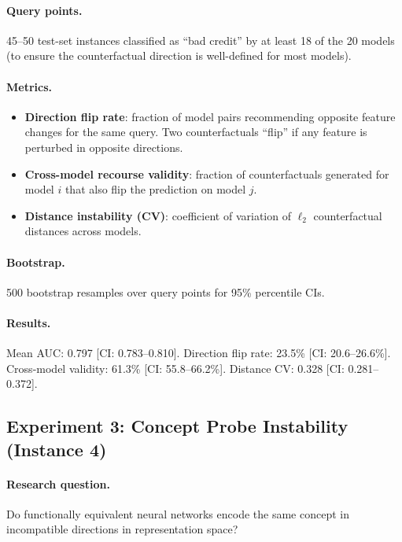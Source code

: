 \documentclass[11pt,a4paper]{article}
\begin{document}
\paragraph{Query points.}
45--50 test-set instances classified as ``bad credit'' by at least 18 of the
20 models (to ensure the counterfactual direction is well-defined for most
models).

\paragraph{Metrics.}
\begin{itemize}[nosep]
  \item \textbf{Direction flip rate}: fraction of model pairs recommending
    opposite feature changes for the same query.  Two counterfactuals ``flip''
    if any feature is perturbed in opposite directions.
  \item \textbf{Cross-model recourse validity}: fraction of counterfactuals
    generated for model $i$ that also flip the prediction on model $j$.
  \item \textbf{Distance instability (CV)}: coefficient of variation of
    $\ell_2$ counterfactual distances across models.
\end{itemize}

\paragraph{Bootstrap.}
500 bootstrap resamples over query points for 95\% percentile CIs.

\paragraph{Results.}
Mean AUC: 0.797 [CI: 0.783--0.810].  Direction flip rate: 23.5\%
[CI: 20.6--26.6\%].  Cross-model validity: 61.3\% [CI: 55.8--66.2\%].
Distance CV: 0.328 [CI: 0.281--0.372].

\subsection{Experiment 3: Concept Probe Instability (Instance 4)}
\label{app:exp-concept}

\paragraph{Research question.}
Do functionally equivalent neural networks encode the same concept in
incompatible directions in representation space?
\end{document}
